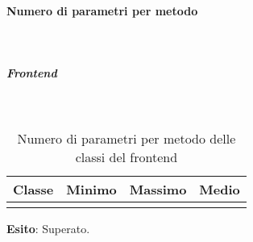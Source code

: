 \paragraph{Numero di parametri per metodo} \mbox{} \\
\subparagraph{Frontend} \mbox{} \\
\begin{center}
\begin{longtable}{| >{\centering}p{7cm} | >{\centering}p{1.8cm} | >{\centering}p{1.8cm} | >{\centering}p{1.8cm} |}
\textbf{Classe} & \textbf{Minimo} & \textbf{Massimo} & \textbf{Medio} \tabularnewline \hline 

\caption{Numero di parametri per metodo delle classi del frontend}
\end{longtable}
\end{center}
\textbf{Esito}: Superato.